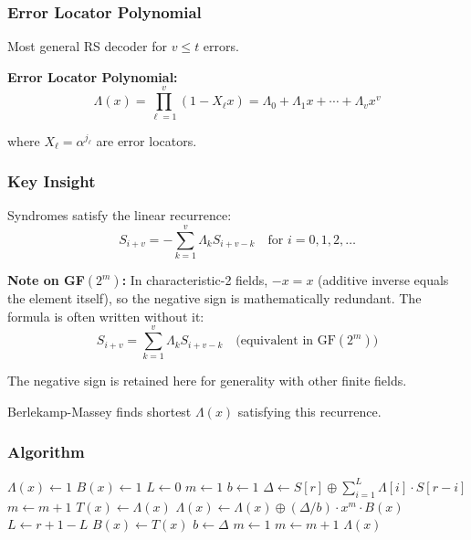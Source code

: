 \documentclass[11pt,a4paper]{article}
\begin{document}
\subsubsection{Error Locator Polynomial}

Most general RS decoder for $v \leq t$ errors.

\textbf{Error Locator Polynomial:}
\begin{equation}
\Lambda(x) = \prod_{\ell=1}^v (1 - X_\ell x) = \Lambda_0 + \Lambda_1 x + \cdots + \Lambda_v x^v
\end{equation}

where $X_\ell = \alpha^{j_\ell}$ are error locators.

\subsubsection{Key Insight}

Syndromes satisfy the linear recurrence:
\begin{equation}
S_{i+v} = -\sum_{k=1}^v \Lambda_k S_{i+v-k} \quad \text{for } i = 0, 1, 2, \ldots
\end{equation}

\textbf{Note on GF$(2^m)$:} In characteristic-2 fields, $-x = x$ (additive inverse equals the element itself), so the negative sign is mathematically redundant. The formula is often written without it:
\begin{equation}
S_{i+v} = \sum_{k=1}^v \Lambda_k S_{i+v-k} \quad \text{(equivalent in GF}(2^m)\text{)}
\end{equation}

The negative sign is retained here for generality with other finite fields.

Berlekamp-Massey finds shortest $\Lambda(x)$ satisfying this recurrence.

\subsubsection{Algorithm}

\begin{algorithm}[H]
\caption{Berlekamp-Massey Algorithm}
\begin{algorithmic}[1]
\State $\Lambda(x) \gets 1$
\State $B(x) \gets 1$
\State $L \gets 0$ 
\State $m \gets 1$ 
\State $b \gets 1$ 
    \State {}
    \State $\Delta \gets S[r] \oplus \sum_{i=1}^L \Lambda[i] \cdot S[r-i]$
        \State $m \gets m + 1$
    \Else
        \State $T(x) \gets \Lambda(x)$
        \State $\Lambda(x) \gets \Lambda(x) \oplus (\Delta/b) \cdot x^m \cdot B(x)$
            \State $L \gets r + 1 - L$
            \State $B(x) \gets T(x)$
            \State $b \gets \Delta$
            \State $m \gets 1$
        \Else
            \State $m \gets m + 1$
        \EndIf
    \EndIf
\EndFor
\State \Return $\Lambda(x)$
\end{algorithmic}
\end{algorithm}
\end{document}
